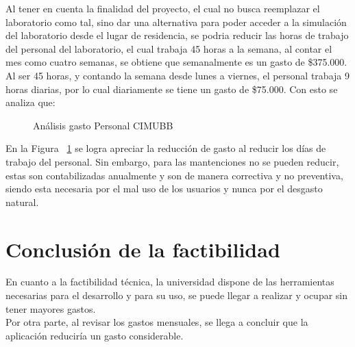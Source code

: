 Al tener en cuenta la finalidad del proyecto, el cual no busca reemplazar el laboratorio como tal, sino dar una alternativa para poder acceder a la simulación del laboratorio desde el lugar de residencia, se podria reducir las horas de trabajo del personal del laboratorio, el cual trabaja 45 horas a la semana, al contar el mes como cuatro semanas, se obtiene que semanalmente es un gasto de \$375.000. Al ser 45 horas, y contando la semana desde lunes a viernes, el personal trabaja 9 horas diarias, por lo cual diariamente se tiene un gasto de \$75.000. Con esto se analiza que:

\begin{figure}[h]
\centering
\caption{Análisis gasto Personal CIMUBB}
\label{gasto}
\end{figure}

En la Figura ~\ref{gasto} se logra apreciar la reducción de gasto al reducir los días de trabajo del personal. Sin embargo, para las mantenciones no se pueden reducir, estas son contabilizadas anualmente y son de manera correctiva y no preventiva, siendo esta necesaria por el mal uso de los usuarios y nunca por el desgasto natural.  
\section{Conclusión de la factibilidad}
En cuanto a la factibilidad técnica, la universidad dispone de las herramientas necesarias para el desarrollo y para su uso, se puede llegar a realizar y ocupar sin tener mayores gastos. \\
Por otra parte, al revisar los gastos mensuales, se llega a concluir que la aplicación reduciría un gasto considerable.